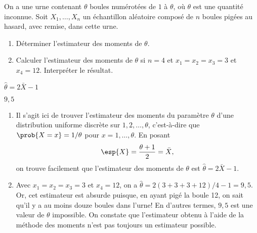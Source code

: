 \begin{exercice}
  On a une urne contenant $\theta$ boules numérotées de $1$ à
  $\theta$, où $\theta$ est une quantité inconnue. Soit $X_1, \dots,
  X_n$ un échantillon aléatoire composé de $n$ boules pigées au
  hasard, avec remise, dans cette urne.
  \begin{enumerate}
  \item Déterminer l'estimateur des moments de $\theta$.
  \item Calculer l'estimateur des moments de $\theta$ si $n = 4$ et
    $x_1 = x_2 = x_3 = 3$ et $x_4 = 12$. Interpréter le résultat.
  \end{enumerate}
  \begin{rep}
    \begin{inparaenum}
    \item $\hat{\theta} = 2 \bar{X} - 1$
    \item $9,5$
    \end{inparaenum}
  \end{rep}
  \begin{sol}
    \begin{enumerate}
    \item Il s'agit ici de trouver l'estimateur des moments du
      paramètre $\theta$ d'une distribution uniforme discrète sur $1,
      2, \dots, \theta$, c'est-à-dire que $\prob{X = x} = 1/\theta$
      pour $x = 1, \dots, \theta$. En posant
      \begin{align*}
        \esp{X} = \frac{\theta + 1}{2} = \bar{X},
      \end{align*}
      on trouve facilement que l'estimateur des moments de $\theta$
      est $\hat{\theta} = 2 \bar{X} - 1$.
    \item Avec $x_1 = x_2 = x_3 = 3$ et $x_4 = 12$, on a $\hat{\theta}
      = 2 (3 + 3 + 3 + 12)/4 - 1 = 9,5$. Or, cet estimateur est
      absurde puisque, en ayant pigé la boule 12, on sait qu'il y a au
      moins douze boules dans l'urne! En d'autres termes, $9,5$ est
      une valeur de $\theta$ impossible. On constate que l'estimateur
      obtenu à l'aide de la méthode des moments n'est pas toujours un
      estimateur possible.
    \end{enumerate}
  \end{sol}
\end{exercice}

